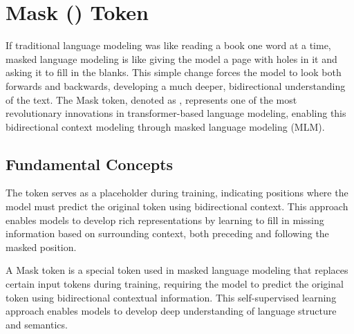 
\section{Mask (\mask{}) Token}

If traditional language modeling was like reading a book one word at a time, masked language modeling is like giving the model a page with holes in it and asking it to fill in the blanks. This simple change forces the model to look both forwards and backwards, developing a much deeper, bidirectional understanding of the text. The Mask token, denoted as \mask{}, represents one of the most revolutionary innovations in transformer-based language modeling, enabling this bidirectional context modeling through masked language modeling (MLM).

\subsection{Fundamental Concepts}

The \mask{} token serves as a placeholder during training, indicating positions where the model must predict the original token using bidirectional context. This approach enables models to develop rich representations by learning to fill in missing information based on surrounding context, both preceding and following the masked position.

\begin{definition}
A Mask token \mask{} is a special token used in masked language modeling that replaces certain input tokens during training, requiring the model to predict the original token using bidirectional contextual information. This self-supervised learning approach enables models to develop deep understanding of language structure and semantics.
\end{definition}

